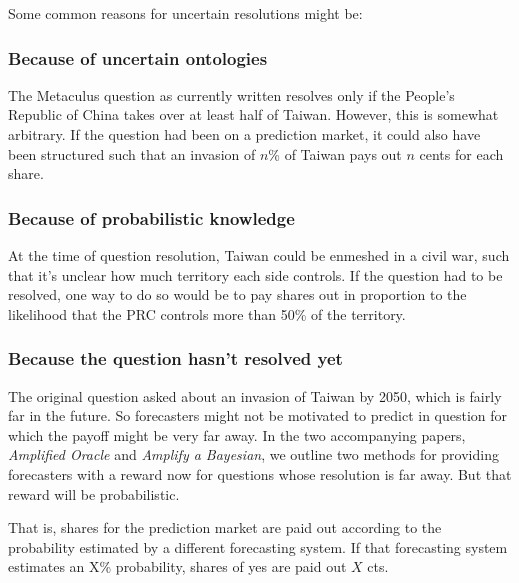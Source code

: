 \documentclass[]{article}
\begin{document}
Some common reasons for uncertain resolutions might be:

\hypertarget{because-of-uncertain-ontologies}{%
\subsubsection{Because of uncertain
ontologies}\label{because-of-uncertain-ontologies}}

The Metaculus question as currently written resolves only if the
People's Republic of China takes over at least half of Taiwan. However,
this is somewhat arbitrary. If the question had been on a prediction
market, it could also have been structured such that an invasion of
\(n\)\% of Taiwan pays out \(n\) cents for each share.

\hypertarget{because-of-probabilistic-knowledge}{%
\subsubsection{Because of probabilistic
knowledge}\label{because-of-probabilistic-knowledge}}

At the time of question resolution, Taiwan could be enmeshed in a civil
war, such that it's unclear how much territory each side controls. If
the question had to be resolved, one way to do so would be to pay shares
out in proportion to the likelihood that the PRC controls more than 50\%
of the territory.

\hypertarget{because-the-question-hasnt-resolved-yet}{%
\subsubsection{Because the question hasn't resolved
yet}\label{because-the-question-hasnt-resolved-yet}}

The original question asked about an invasion of Taiwan by 2050, which
is fairly far in the future. So forecasters might not be motivated to
predict in question for which the payoff might be very far away. In the
two accompanying papers, \emph{Amplified Oracle} and \emph{Amplify a
Bayesian}, we outline two methods for providing forecasters with a
reward now for questions whose resolution is far away. But that reward
will be probabilistic.

That is, shares for the prediction market are paid out according to the
probability estimated by a different forecasting system. If that
forecasting system estimates an X\% probability, shares of yes are paid
out \(X\) cts.
\end{document}
